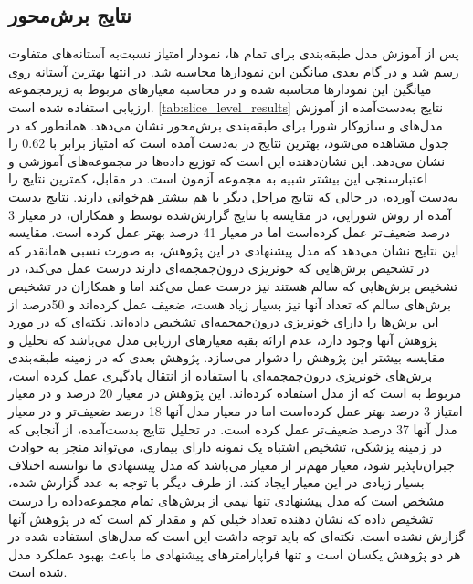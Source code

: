 \subsection{نتایج برش‌محور }
پس از آموزش مدل طبقه‌بندی برای تمام 
ها،
نمودار امتیاز
نسبت‌به آستانه‌های متفاوت رسم شد و در گام بعدی میانگین این نمودارها محاسبه شد. در انتها بهترین آستانه روی میانگین این نمودار‌ها محاسبه شده و در محاسبه معیارهای مربوط به زیرمجموعه ارزیابی استفاده شده است.
 \autoref{tab:slice_level_results}
  نتایج به‌دست‌آمده از آموزش مدل‌های  و سازوکار شورا برای طبقه‌بندی برش‌محور نشان می‌دهد. همانطور که در جدول مشاهده می‌شود، بهترین نتایج در
  به‌دست آمده است که امتیاز 
   برابر با
  $0.62$
 را نشان می‌دهد. این نشان‌دهنده این است که توزیع داده‌ها در مجموعه‌های آموزشی و اعتبارسنجی این 
  بیشتر شبیه به مجموعه آزمون است. در مقابل، 
   کمترین نتایج را به‌دست آورده، در حالی که نتایج مراحل دیگر با هم بیشتر هم‌خوانی دارند. نتایج بدست آمده از روش شورایی، در مقایسه با نتایج گزارش‌شده توسط
   \cite{hssayeni2020intracranial}
   و همکاران، در معیار
3 درصد ضعیف‌تر عمل کرده‌است اما در معیار
41 درصد بهتر عمل کرده است. مقایسه این نتایج نشان می‌دهد که مدل پیشنهادی در این پژوهش، به صورت نسبی همانقدر که در تشخیص برش‌هایی که خونریزی درون‌جمجمه‌ای دارند درست عمل می‌کند، در تشخیص برش‌هایی که سالم هستند نیز درست عمل می‌‌کند اما 
و همکاران در تشخیص برش‌های سالم که تعداد آنها نیز بسیار زیاد هست،‌ ضعیف عمل کرده‌اند و 50درصد از این برش‌ها را دارای خونریزی درون‌جمجمه‌ای تشخیص داده‌اند. نکته‌ای که در مورد پژوهش آنها وجود دارد،‌ عدم ارائه بقیه معیارهای ارزیابی مدل می‌باشد که تحلیل و مقایسه‌ بیشتر این پژوهش را دشوار می‌سازد.
پژوهش بعدی که در زمینه طبقه‌بندی برش‌های خونریزی درون‌جمجمه‌ای با استفاده از انتقال یادگیری عمل کرده است، مربوط به 
\cite{neethi2022stroke}
است که از مدل 
استفاده کرده‌اند. این پژوهش در معیار
20 درصد و در معیار امتیاز
3 درصد بهتر عمل کرده‌است اما در معیار 
مدل آنها 18 درصد ضعیف‌تر و در معیار 
مدل آنها 37 درصد ضعیف‌تر عمل کرده است. در تحلیل نتایج بدست‌آمده، از آنجایی که در زمینه پزشکی، تشخیص اشتباه یک نمونه دارای بیماری،‌ می‌تواند منجر به حوادث جبران‌ناپذیر شود، معیار 
مهم‌تر از معیار 
می‌باشد که مدل پیشنهادی ما توانسته اختلاف بسیار زیادی در این معیار ایجاد کند. از طرف دیگر با توجه به عدد 
گزارش شده، مشخص است که مدل پیشنهادی 
تنها نیمی از برش‌های تمام مجموعه‌داده را درست تشخیص داده که نشان دهنده تعداد خیلی کم 
و مقدار کم 
است که در پژوهش آنها گزارش نشده است. نکته‌ای که باید توجه داشت این است که مدل‌های استفاده شده در هر دو پژوهش یکسان است و تنها فراپارامتر‌های پیشنهادی ما باعث بهبود عملکرد مدل شده است.


